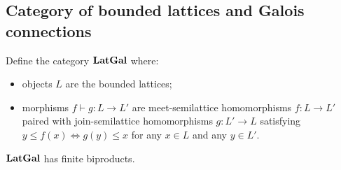 
\subsection{Category of bounded lattices and Galois connections}

Define the category $\mathbf{LatGal}$ where:
\begin{itemize}
\item objects $L$ are the bounded lattices;
\item morphisms $f \vdash g: L \to L'$ are meet-semilattice homomorphisms $f: L \to L'$ paired with
join-semilattice homomorphisms $g: L' \to L$ satisfying $y \leq f(x) \iff g(y) \leq x$ for any $x \in L$ and any
$y \in L'$.
\end{itemize}

\noindent $\mathbf{LatGal}$ has finite biproducts. 
